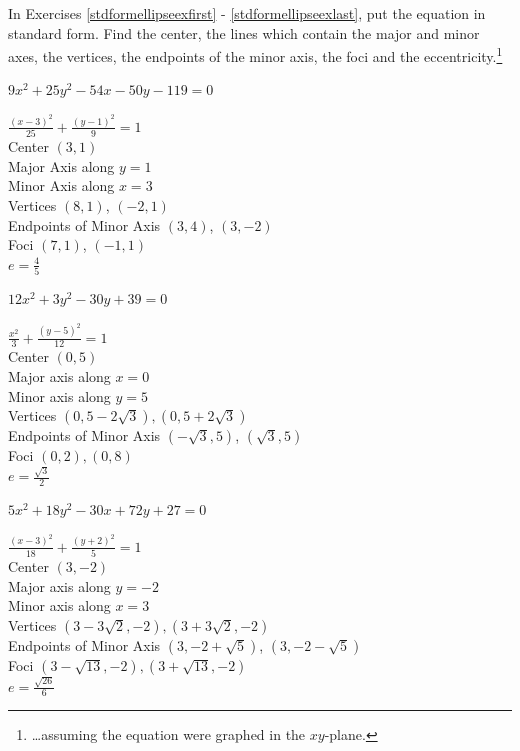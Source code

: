 \documentclass{ximera}
\begin{document}
\begin{question}
In Exercises \ref{stdformellipseexfirst} - \ref{stdformellipseexlast}, put the equation in standard form.   Find the center, the lines which contain the major and minor axes, the vertices, the endpoints of the minor axis, the foci and the eccentricity.\footnote{\ldots assuming the equation were graphed in the $xy$-plane.}

\begin{problem}\label{stdformellipseexfirst}   \label{oddellipsenine}
    $9x^2+25y^2-54x-50y-119=0$  

\begin{solution}
    $\frac{(x-3)^2}{25} + \frac{\left(y-1\right)^2}{9} = 1$\\
Center  $\left(3, 1 \right)$\\
Major Axis along $y=1$\\
Minor Axis along $x=3$\\
Vertices  $\left( 8, 1   \right)$, $(-2, 1)$\\
Endpoints of Minor Axis $\left(3,4\right)$, $\left(3,-2\right)$\\
Foci $\left(7,1 \right)$, $\left(-1, 1\right)$\\
$e = \frac{4}{5}$
\end{solution}
\end{problem}

\begin{problem}
    $12x^{2} + 3y^{2} - 30y + 39 = 0$

\begin{solution}
     $\frac{x^{2}}{3} + \frac{(y - 5)^{2}}{12} = 1$\\
Center $(0, 5)$\\
Major axis along $x = 0$\\
Minor axis along $y = 5$\\
Vertices $(0, 5 - 2\sqrt{3}), (0, 5 + 2\sqrt{3})$\\
Endpoints of Minor Axis $(-\sqrt{3},5)$, $(\sqrt{3},5)$\\
Foci $(0, 2), (0, 8)$\\
$e = \frac{\sqrt{3}}{2}$
\end{solution}
\end{problem}

\begin{problem}\label{oddellipseeleven}
    $5x^{2} + 18y^{2} - 30x + 72y + 27 = 0$  

\begin{solution}
    $\frac{(x - 3)^{2}}{18} + \frac{(y + 2)^{2}}{5} = 1$\\
Center $(3, -2)$\\
Major axis along $y = -2$\\
Minor axis along $x = 3$\\
Vertices $(3 - 3\sqrt{2}, -2), (3 + 3\sqrt{2}, -2)$\\
Endpoints of Minor Axis $(3,-2+\sqrt{5})$, $(3,-2-\sqrt{5})$\\
Foci $(3 - \sqrt{13}, -2), (3 + \sqrt{13}, -2)$\\
$e = \frac{\sqrt{26}}{6}$
\end{solution}
\end{problem}


\end{question}
\end{document}
